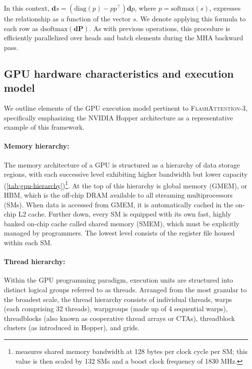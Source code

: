 In this context, $\mathbf{d}s = (\mathrm{diag}(p) - p p^\top)\mathbf{d}p$, where $p = \mathrm{softmax}(s)$, expresses the relationship as a function of the vector $s$. We denote applying this formula to each row as $\mathrm{dsoftmax}(\mathbf{dP})$. As with previous operations, this procedure is efficiently parallelized over heads and batch elements during the MHA backward pass.

\subsection{GPU hardware characteristics and execution model}
\label{subsec:hardware}

We outline elements of the GPU execution model pertinent to \textsc{FlashAttention-3}, specifically emphasizing the NVIDIA Hopper architecture as a representative example of this framework.

\paragraph{Memory hierarchy:} The memory architecture of a GPU is structured as a hierarchy of data storage regions, with each successive level exhibiting higher bandwidth but lower capacity (\cref{tab:gpu-hierarchy})\footnote{\citet{luo2024benchmarking} measures shared memory bandwidth at 128 bytes per clock cycle per SM; this value is then scaled by 132 SMs and a boost clock frequency of 1830 MHz.}. At the top of this hierarchy is global memory (GMEM), or HBM, which is the off-chip DRAM available to all streaming multiprocessors (SMs). When data is accessed from GMEM, it is automatically cached in the on-chip L2 cache. Further down, every SM is equipped with its own fast, highly banked on-chip cache called shared memory (SMEM), which must be explicitly managed by programmers. The lowest level consists of the register file housed within each SM.

\paragraph{Thread hierarchy:} Within the GPU programming paradigm, execution units are structured into distinct logical groups referred to as threads. Arranged from the most granular to the broadest scale, the thread hierarchy consists of individual threads, warps (each comprising 32 threads), warpgroups (made up of 4 sequential warps), threadblocks (also known as cooperative thread arrays or CTAs), threadblock clusters (as introduced in Hopper), and grids.

